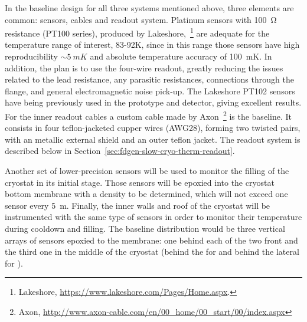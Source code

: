 In the baseline design for all three systems mentioned above, three elements are common: sensors, cables and readout system.
Platinum sensors with \SI{100}{\ohm} resistance (PT100 series), produced by Lakeshore,~\footnote{Lakeshore\texttrademark{}, \url{https://www.lakeshore.com/Pages/Home.aspx}.}
are adequate for the temperature range of interest, 83-92\si{K}, since in this range those sensors have high reproducibility 
$\sim\SI{5}{mK}$ and absolute temperature accuracy of \SI{100}{mK}.
In addition, the plan is to use the four-wire readout, greatly reducing the issues related to the lead resistance, any parasitic resistances,
connections through the flange, and general electromagnetic noise pick-up. The Lakeshore PT102 sensors
have being previously used in the  prototype and  detector,
giving excellent results. For the inner readout cables a custom cable made by Axon~\footnote{Axon\texttrademark{}, \url{http://www.axon-cable.com/en/00_home/00_start/00/index.aspx}} is the baseline. It consists in four teflon-jacketed 
cupper wires (AWG28), forming two twisted pairs, with an metallic external shield
and an outer teflon jacket.
The readout system is described below in  Section~\ref{sec:fdgen-slow-cryo-therm-readout}. %



Another set of lower-precision sensors will be used to monitor the filling of the cryostat in its initial stage. Those sensors will be epoxied into the cryostat bottom membrane with
a density to be determined, which will not exceed one sensor every \SI{5}{m}. 
Finally, the inner walls and roof of the cryostat will be instrumented with the same type of sensors in order to monitor their temperature during cooldown and filling.
The baseline distribution would be three vertical arrays of sensors epoxied to the membrane: one behind each of the two %
front  and the third one in the middle of the cryostat
(behind the  for \single and behind the lateral %
 for \dual). 

